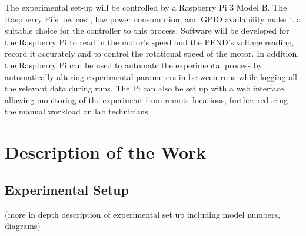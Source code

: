 \documentclass[a4]{report}
\begin{document}
	The experimental set-up will be controlled by a Raspberry Pi 3 Model B. The Raspberry Pi's low cost, low power consumption, and GPIO availability make it a suitable choice for the controller to this process. Software will be developed for the Raspberry Pi to read in the motor's speed and the PEND's voltage reading, record it accurately and to control the rotational speed of the motor. In addition, the Raspberry Pi can be used to automate the experimental process by automatically altering experimental parameters in-between runs while logging all the relevant data during runs. The Pi can also be set up with a web interface, allowing monitoring of the experiment from remote locations, further reducing the manual workload on lab technicians.



	



	\chapter*{Description of the Work}



	\section{Experimental Setup}
	(more in depth description of experimental set up including model numbers, diagrams)
\end{document}
